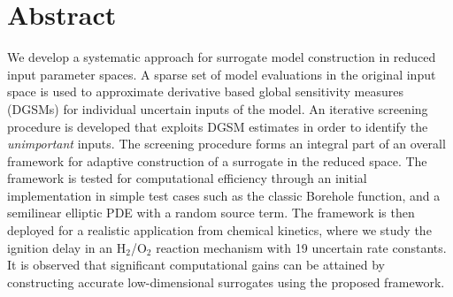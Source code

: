 \section*{Abstract}
We develop a systematic approach for surrogate model
construction in reduced input parameter spaces.
%
A sparse set of model evaluations in the original input space is used to  
approximate derivative based global sensitivity measures (DGSMs) 
for individual uncertain inputs of the model.
An iterative screening procedure is developed that exploits DGSM estimates in
order to identify the \emph{unimportant} inputs. The screening procedure forms
an integral part of an overall framework for adaptive construction of a
surrogate in the reduced space. The framework is tested for computational
efficiency through an initial implementation in simple test cases such as the
classic Borehole function, and a semilinear elliptic PDE with a random source
term. 
The framework is then deployed for a realistic application from chemical
kinetics, where we study the ignition delay in an H$_2$/O$_2$ reaction
mechanism with 19 uncertain rate constants.  It is observed that significant
computational gains can be attained by constructing accurate low-dimensional
surrogates using the proposed framework.
 
